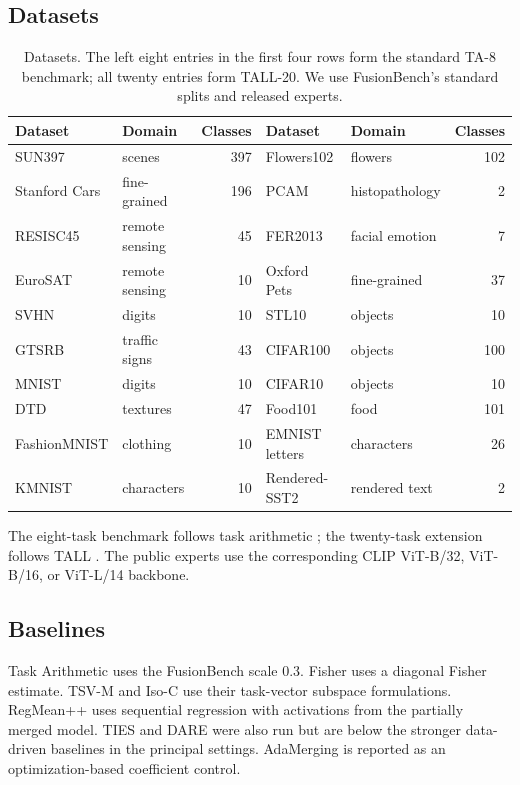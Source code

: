 \documentclass[letterpaper]{article} %
\theoremstyle{plain}
\theoremstyle{definition}
\begin{document}
\subsection{Datasets}
\begin{table}[tb]
\centering
{\small
\begin{tabular*}{\textwidth}{@{\extracolsep{\fill}}llrllr}
\toprule
Dataset & Domain & Classes & Dataset & Domain & Classes \\
\midrule
SUN397 & scenes & 397 & Flowers102 & flowers & 102 \\
Stanford Cars & fine-grained & 196 & PCAM & histopathology & 2 \\
RESISC45 & remote sensing & 45 & FER2013 & facial emotion & 7 \\
EuroSAT & remote sensing & 10 & Oxford Pets & fine-grained & 37 \\
SVHN & digits & 10 & STL10 & objects & 10 \\
GTSRB & traffic signs & 43 & CIFAR100 & objects & 100 \\
MNIST & digits & 10 & CIFAR10 & objects & 10 \\
DTD & textures & 47 & Food101 & food & 101 \\
FashionMNIST & clothing & 10 & EMNIST letters & characters & 26 \\
KMNIST & characters & 10 & Rendered-SST2 & rendered text & 2 \\
\bottomrule
\end{tabular*}
}
\caption{Datasets. The left eight entries in the first four rows form the standard
TA-8 benchmark; all twenty entries form TALL-20. We use FusionBench's standard splits
and released experts.}
\label{tab:datasets}
\end{table}

The eight-task benchmark follows task arithmetic \citep{ilharco2023taskarithmetic}; the
twenty-task extension follows TALL \citep{wang2024tall}. The public experts use the
corresponding CLIP ViT-B/32, ViT-B/16, or ViT-L/14 backbone.

\subsection{Baselines}
Task Arithmetic uses the FusionBench scale $0.3$. Fisher uses a diagonal Fisher estimate.
TSV-M and Iso-C use their task-vector subspace formulations. RegMean++ uses sequential
regression with activations from the partially merged model. TIES and DARE were also run
but are below the stronger data-driven baselines in the principal settings. AdaMerging is
reported as an optimization-based coefficient control.
\end{document}
